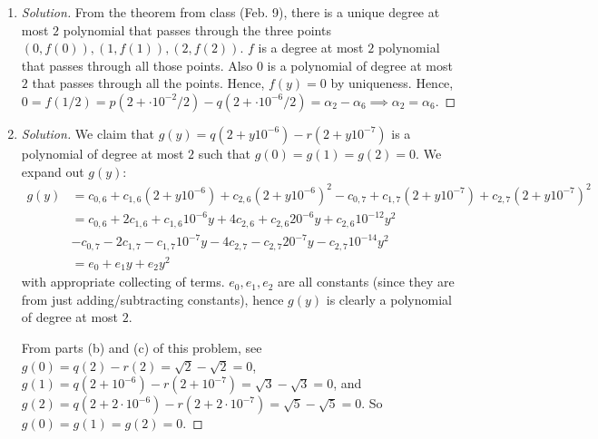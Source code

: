 \documentclass{article}
\begin{document}
\begin{enumerate}
\begin{proof}[Solution]
		From parts (a) and (b) of this problem,
		we have $f(0) = p(2) - q(2) = \sqrt{2} - \sqrt{2} = 0$,
		$f(1) = p(2 + 10^{-2}) - q(2 + 10^{-6}) = \sqrt{3} - \sqrt{3} = 0$,
		and $f(2) = p(2 + 2\cdot 10^{-2}) - q(2 + 2\cdot 10^{-6}) = \sqrt{5} - \sqrt{5} = 0$.
		So $f(0) = f(1) = f(2) = 0$.
	\end{proof}
	\item \begin{proof}[Solution]\let\qed\relax
		From the theorem from class (Feb. 9),
		there is a unique degree at most $2$ polynomial that passes
		through the three points
		$(0,f(0)), (1,f(1)), (2,f(2))$.
		$f$ is a degree at most $2$ polynomial that passes through all those points.
		Also $0$ is a polynomial of degree at most $2$ that passes through all the points.
		Hence, $f(y) = 0$ by uniqueness.
		Hence, $0 = f(1/2) =
		p(2 + \cdot 10^{-2}/2) - q(2 + \cdot 10^{-6}/2) = \alpha_2 - \alpha_6
		\implies \alpha_2 = \alpha_6$.
	\end{proof}
	\item \begin{proof}[Solution]\let\qed\relax
		We claim that $g(y) = q(2+y10^{-6}) - r(2 + y10^{-7})$
		is a polynomial of degree at most $2$ such that $g(0) = g(1) = g(2) = 0$.	
		We expand out $g(y)$:
		\begin{align*}
			g(y)
			&= c_{0,6} + c_{1,6}(2 + y10^{-6}) + c_{2,6}(2 + y10^{-6})^2
			- c_{0,7} + c_{1,7}(2 + y10^{-7}) + c_{2,7}(2 + y10^{-7})^2\\
			&= c_{0,6} + 2c_{1,6} + c_{1,6} 10^{-6}y
			+ 4c_{2,6} + c_{2,6}20^{-6}y + c_{2,6}10^{-12}y^2\\
			&- c_{0,7} - 2c_{1,7} - c_{1,7} 10^{-7}y
			- 4c_{2,7} - c_{2,7}20^{-7}y - c_{2,7}10^{-14}y^2\\
			&= e_0 + e_1y + e_2y^2
		\end{align*}
		with appropriate collecting of terms.
		$e_0,e_1,e_2$ are all constants (since they are from just adding/subtracting constants),
		hence $g(y)$ is clearly a polynomial of degree at most $2$.
		
		From parts (b) and (c) of this problem,
		see $g(0) = q(2) - r(2) = \sqrt{2} - \sqrt{2} = 0$,
		$g(1) = q(2 + 10^{-6}) - r(2 + 10^{-7}) = \sqrt{3} - \sqrt{3} = 0$,
		and $g(2) = q(2 + 2\cdot 10^{-6}) - r(2 + 2\cdot 10^{-7}) = \sqrt{5} - \sqrt{5} = 0$.
		So $g(0) = g(1) = g(2) = 0$.


\end{proof}
\end{enumerate}
\end{document}

